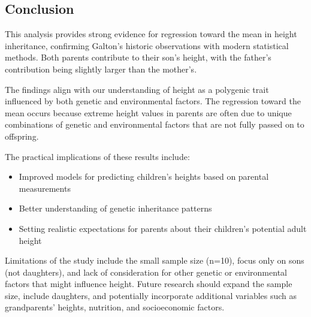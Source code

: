 \documentclass[12pt]{article}
\begin{document}
\subsection{Conclusion}
This analysis provides strong evidence for regression toward the mean in height inheritance, confirming Galton's historic observations with modern statistical methods. Both parents contribute to their son's height, with the father's contribution being slightly larger than the mother's. 

The findings align with our understanding of height as a polygenic trait influenced by both genetic and environmental factors. The regression toward the mean occurs because extreme height values in parents are often due to unique combinations of genetic and environmental factors that are not fully passed on to offspring.

The practical implications of these results include:
\begin{itemize}
    \item Improved models for predicting children's heights based on parental measurements
    \item Better understanding of genetic inheritance patterns
    \item Setting realistic expectations for parents about their children's potential adult height
\end{itemize}

Limitations of the study include the small sample size (n=10), focus only on sons (not daughters), and lack of consideration for other genetic or environmental factors that might influence height. Future research should expand the sample size, include daughters, and potentially incorporate additional variables such as grandparents' heights, nutrition, and socioeconomic factors.
\end{document}
